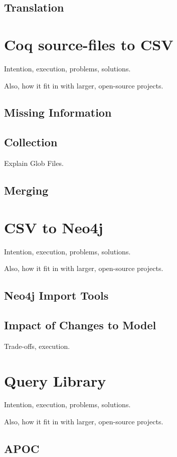 \subsection{Translation}
\label{subsec:translation}

\section{Coq source-files to CSV}
Intention, execution, problems, solutions.

Also, how it fit in with larger, open-source projects.

\subsection{Missing Information}

\subsection{Collection}
Explain Glob Files.

\subsection{Merging}

\section{CSV to Neo4j}
Intention, execution, problems, solutions.

Also, how it fit in with larger, open-source projects.

\subsection{Neo4j Import Tools}

\subsection{Impact of Changes to Model}
Trade-offs, execution.

\section{Query Library}
Intention, execution, problems, solutions.

Also, how it fit in with larger, open-source projects.

\subsection{APOC}

